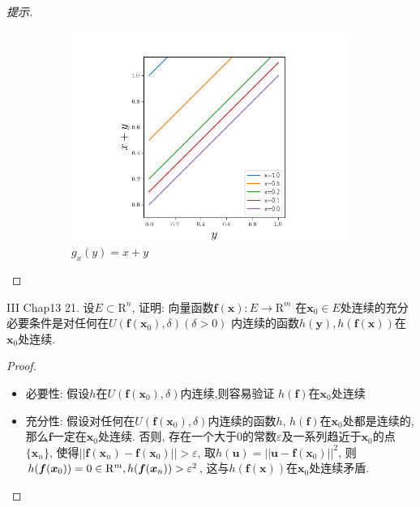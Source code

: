 \documentclass[a4paper,12pt]{article}
\begin{document}
\begin{proof}[提示]
\begin{figure}[htbp]
\begin{subfigure}{0.45\textwidth}
      \includegraphics[width = \textwidth]{2.png}
      \caption{$g_x(y)=x+y$}
      \label{fig:2}
    \end{subfigure}
    \caption{}
  \end{figure}
\end{proof}


\noindent III Chap13 21. 设$E\subset\mathrm{R}^n$, 证明: 向量函数$\bm{f}(\bm{x}):E\to\mathrm{R}^m$
在$\bm{x}_0\in E$处连续的充分必要条件是对任何在$U(\bm{f}(\bm{x}_0),\delta)(\delta>0)$
内连续的函数$h(\bm{y}),h(\bm{f}(\bm{x}))$在$\bm{x}_0$处连续.
\begin{proof}\ 
  \begin{itemize}
    \item 必要性: 假设$h$在$U(\bm{f}(\bm{x}_0),\delta)$内连续,则容易验证
      $h(\bm{f})$在$\bm{x}_0$处连续
    \item 充分性: 假设对任何在$U(\bm{f}(\bm{x}_0),\delta)$内连续的函数$h$, $h(\bm{f})$在$\bm{x}_0$处都是连续的,
      那么$\bm{f}$一定在$\bm{x}_0$处连续. 否则, 存在一个大于0的常数$\varepsilon$及一系列趋近于$\bm{x}_0$的点$\{\bm{x}_n\}$, 
      使得$||\bm{f}(\bm{x}_n)-\bm{f}(\bm{x}_0)||>\varepsilon$, 取$h(\bm{u})=||\bm{u}-\bm{f}(\bm{x}_0)||^2$, 
      则$h(\bm{f}(\bm{x}_0))=0\in\mathrm{R}^m,h(\bm{f}(\bm{x}_n))>\varepsilon^2$, 这与$h(\bm{f}(\bm{x}))$在$\bm{x}_0$处连续矛盾.
  \end{itemize}
\end{proof}
\end{document}
